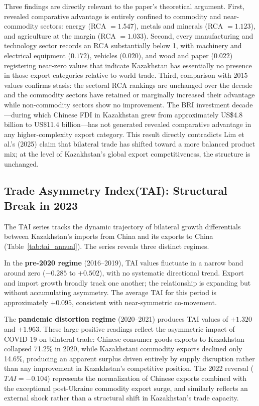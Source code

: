 \documentclass[12pt]{article}
\begin{document}
Three findings are directly relevant to the paper's theoretical argument. First, revealed comparative advantage is entirely confined to commodity and near-commodity sectors: energy (RCA $= 1.547$), metals and minerals (RCA $= 1.123$), and agriculture at the margin (RCA $= 1.033$). Second, every manufacturing and technology sector records an RCA substantially below 1, with machinery and electrical equipment ($0.172$), vehicles ($0.020$), and wood and paper ($0.022$) registering near-zero values that indicate Kazakhstan has essentially no presence in those export categories relative to world trade. Third, comparison with 2015 values confirms stasis: the sectoral RCA rankings are unchanged over the decade and the commodity sectors have retained or marginally increased their advantage while non-commodity sectors show no improvement. The BRI investment decade---during which Chinese FDI in Kazakhstan grew from approximately US\$4.8 billion to US\$11.4 billion---has not generated revealed comparative advantage in any higher-complexity export category. This result directly contradicts Lim et al.'s (2025) claim that bilateral trade has shifted toward a more balanced product mix; at the level of Kazakhstan's global export competitiveness, the structure is unchanged.

\subsection{Trade Asymmetry Index(TAI): Structural Break in 2023}

The TAI series tracks the dynamic trajectory of bilateral growth differentials between Kazakhstan's imports from China and its exports to China (Table~\ref{tab:tai_annual}). The series reveals three distinct regimes.

In the \textbf{pre-2020 regime} (2016--2019), TAI values fluctuate in a narrow band around zero ($-0.285$ to $+0.502$), with no systematic directional trend. Export and import growth broadly track one another; the relationship is expanding but without accumulating asymmetry. The average TAI for this period is approximately $+0.095$, consistent with near-symmetric co-movement.

The \textbf{pandemic distortion regime} (2020--2021) produces TAI values of $+1.320$ and $+1.963$. These large positive readings reflect the asymmetric impact of COVID-19 on bilateral trade: Chinese consumer goods exports to Kazakhstan collapsed 71.2\% in 2020, while Kazakhstani commodity exports declined only 14.6\%, producing an apparent surplus driven entirely by supply disruption rather than any improvement in Kazakhstan's competitive position. The 2022 reversal ($TAI = -0.104$) represents the normalization of Chinese exports combined with the exceptional post-Ukraine commodity export surge, and similarly reflects an external shock rather than a structural shift in Kazakhstan's trade capacity.
\end{document}
